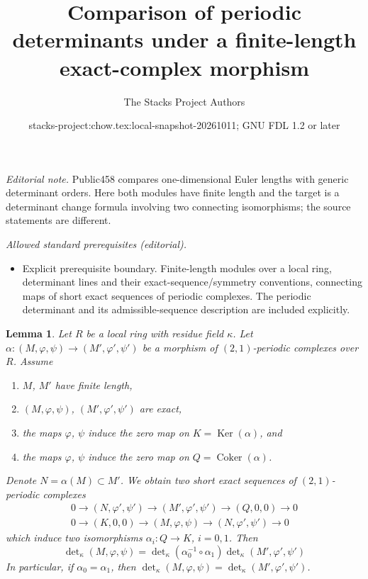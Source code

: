 \documentclass[10pt,a4paper]{amsart}
\title{Comparison of periodic determinants under a finite-length exact-complex morphism}
\author{The Stacks Project Authors}
\date{stacks-project:chow.tex:local-snapshot-20261011; GNU FDL 1.2 or later}
\theoremstyle{plain}
\newtheorem{lemma}[subsection]{Lemma}
\theoremstyle{definition}
\theoremstyle{remark}
\numberwithin{equation}{subsection}
\def\Ker{\mathop{\mathrm{Ker}}}
\def\Coker{\mathop{\mathrm{Coker}}}
\begin{document}
\maketitle
\noindent\textit{Editorial note.} Public458 compares one-dimensional Euler lengths with generic determinant orders. Here both modules have finite length and the target is a determinant change formula involving two connecting isomorphisms; the source statements are different.\par\medskip
\noindent\textit{Allowed standard prerequisites (editorial).}\begin{itemize}
\item Explicit prerequisite boundary. Finite-length modules over a local ring, determinant lines and their exact-sequence/symmetry conventions, connecting maps of short exact sequences of periodic complexes. The periodic determinant and its admissible-sequence description are included explicitly.
\end{itemize}\medskip
\begin{lemma}
\label{lemma-tricky}
Let $R$ be a local ring with residue field $\kappa$.
Let $\alpha : (M, \varphi, \psi) \to (M', \varphi', \psi')$
be a morphism of $(2, 1)$-periodic complexes over $R$.
Assume
\begin{enumerate}
\item $M$, $M'$ have finite length,
\item $(M, \varphi, \psi)$, $(M', \varphi', \psi')$ are exact,
\item the maps $\varphi$, $\psi$ induce the zero map on
$K = \Ker(\alpha)$, and
\item the maps $\varphi$, $\psi$ induce the zero map on
$Q = \Coker(\alpha)$.
\end{enumerate}
Denote $N = \alpha(M) \subset M'$. We obtain two short exact sequences
of $(2, 1)$-periodic complexes
$$
\begin{matrix}
0 \to (N, \varphi', \psi') \to (M', \varphi', \psi') \to (Q, 0, 0) \to 0 \\
0 \to (K, 0, 0) \to (M, \varphi, \psi) \to (N, \varphi', \psi') \to 0
\end{matrix}
$$
which induce two isomorphisms $\alpha_i : Q \to K$, $i = 0, 1$. Then
$$
\det\nolimits_\kappa(M, \varphi, \psi)
=
\det\nolimits_\kappa(\alpha_0^{-1} \circ \alpha_1)
\det\nolimits_\kappa(M', \varphi', \psi')
$$
In particular, if $\alpha_0 = \alpha_1$, then
$\det\nolimits_\kappa(M, \varphi, \psi) =
\det\nolimits_\kappa(M', \varphi', \psi')$.
\end{lemma}
\end{document}
